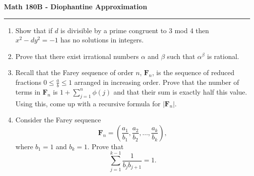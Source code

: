 \documentclass[11pt,letterpaper]{report}
\begin{document}
\begin{center}
{\bf \Large Math 180B - Diophantine Approximation}
\vspace{0.2cm}
\hrule
\end{center}

\begin{enumerate}
	\item Show that if $d$ is divisible by a prime congruent to 3 mod 4 then $x^2 - dy^2 = -1$ has no solutions in integers.

	\vfill

	\item Prove that there exist irrational numbers $\alpha$ and $\beta$ such that $\alpha^\beta$ is rational.

	\vfill


	\item Recall that the Farey sequence of order $n$, $\mathbf{F}_n$, is the sequence of reduced fractions $0\leq \frac{a}{b}\leq 1$ arranged in increasing order. Prove that the number of terms in $\mathbf{F}_n$ is $1 + \sum_{j=1}^n \phi(j)$ and that their sum is exactly half this value. Using this, come up with a recursive formula for $|\mathbf{F}_n|$.

	\vfill

	\item Consider the Farey sequence
	\[
	\mathbf{F}_n= \left(\frac{a_1}{b_1},\frac{a_2}{b_2}, \ldots, \frac{a_k}{b_k}\right),
	\]
	where $b_1  = 1$ and $b_k = 1$. Prove that
	\[
	\sum_{j=1}^{k-1}\frac{1}{b_jb_{j+1}} = 1.
	\]
	\vfill
\end{enumerate}
\end{document}
